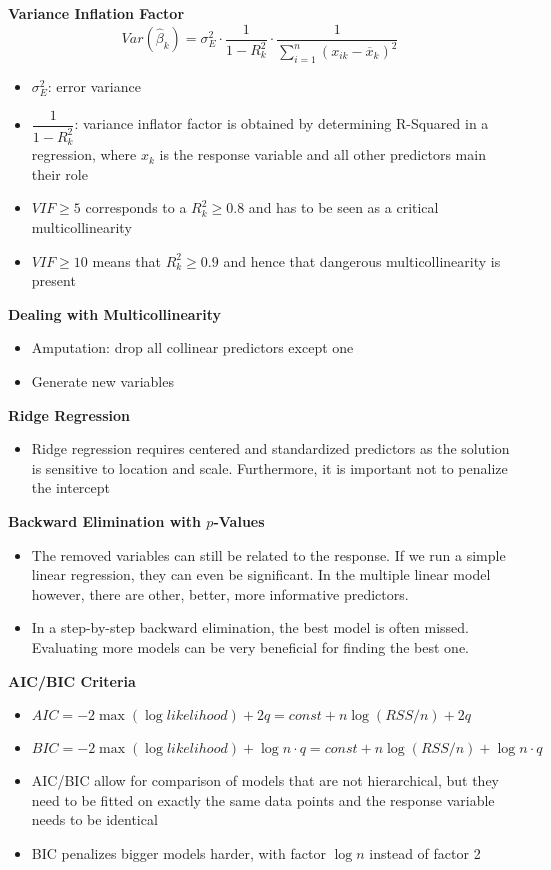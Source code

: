 \documentclass[a4paper]{article}
\begin{document}
\textbf{Variance Inflation Factor}
\[Var(\hat{\beta}_k)=\sigma_E^2\cdot\frac{1}{1-R_k^2}\cdot\frac{1}{\sum_{i=1}^n(x_{ik}-\overline{x}_k)^2} \]
\begin{itemize}
    \item $\sigma_E^2$: error variance
    \item $\dfrac{1}{1-R_k^2}$: variance inflator factor is obtained by determining R-Squared in a regression, where $x_k$ is the response variable and all other predictors main their role
    \item $VIF\geq 5$ corresponds to a $R_k^2\geq0.8$ and has to be seen as a critical multicollinearity
    \item $VIF\geq 10$ means that $R_k^2\geq0.9$ and hence that dangerous multicollinearity is present 
\end{itemize}

\textbf{Dealing with Multicollinearity}
\begin{itemize}
    \item Amputation: drop all collinear predictors except one
    \item Generate new variables
\end{itemize}

\textbf{Ridge Regression}
\begin{itemize}
    \item Ridge regression requires centered and standardized predictors as the solution is sensitive to location and scale. Furthermore, it is important not to penalize the intercept
\end{itemize}

\textbf{Backward Elimination with $p$-Values}
\begin{itemize}
    \item The removed variables can still be related to the response. If we run a simple linear regression, they can even be significant. In the multiple linear model however, there are other, better, more informative predictors.
    \item In a step-by-step backward elimination, the best model is often missed. Evaluating more models can be very beneficial for finding the best one.
\end{itemize}

\textbf{AIC/BIC Criteria}
\begin{itemize}
    \item $AIC=-2\max(\log likelihood)+2q=const+n\log(RSS/n)+2q$
    \item $BIC=-2\max(\log likelihood)+\log n\cdot q=const+n\log(RSS/n)+\log n\cdot q$
    \item AIC/BIC allow for comparison of models that are not hierarchical, but they need to be fitted on exactly the same data points and the response variable needs to be identical
    \item BIC penalizes bigger models harder, with factor $\log n$ instead of factor 2
\end{itemize}
\end{document}
